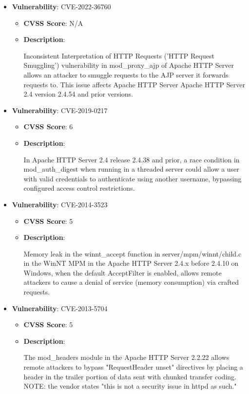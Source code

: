\documentclass{article}
\begin{document}
\begin{itemize}
        \item \textbf{Vulnerability}: CVE-2022-36760
        \begin{itemize}
            \item \textbf{CVSS Score}:  N/A 
            \item \textbf{Description}:
            \parbox[t]{0.9\linewidth}{
                \ttfamily Inconsistent Interpretation of HTTP Requests ('HTTP Request Smuggling') vulnerability in mod\_proxy\_ajp of Apache HTTP Server allows an attacker to smuggle requests to the AJP server it forwards requests to.  This issue affects Apache HTTP Server Apache HTTP Server 2.4 version 2.4.54 and prior versions.
            }
        \end{itemize}
    
        \item \textbf{Vulnerability}: CVE-2019-0217
        \begin{itemize}
            \item \textbf{CVSS Score}:  6 
            \item \textbf{Description}:
            \parbox[t]{0.9\linewidth}{
                \ttfamily In Apache HTTP Server 2.4 release 2.4.38 and prior, a race condition in mod\_auth\_digest when running in a threaded server could allow a user with valid credentials to authenticate using another username, bypassing configured access control restrictions.
            }
        \end{itemize}
    
        \item \textbf{Vulnerability}: CVE-2014-3523
        \begin{itemize}
            \item \textbf{CVSS Score}:  5 
            \item \textbf{Description}:
            \parbox[t]{0.9\linewidth}{
                \ttfamily Memory leak in the winnt\_accept function in server/mpm/winnt/child.c in the WinNT MPM in the Apache HTTP Server 2.4.x before 2.4.10 on Windows, when the default AcceptFilter is enabled, allows remote attackers to cause a denial of service (memory consumption) via crafted requests.
            }
        \end{itemize}
    
        \item \textbf{Vulnerability}: CVE-2013-5704
        \begin{itemize}
            \item \textbf{CVSS Score}:  5 
            \item \textbf{Description}:
            \parbox[t]{0.9\linewidth}{
                \ttfamily The mod\_headers module in the Apache HTTP Server 2.2.22 allows remote attackers to bypass "RequestHeader unset" directives by placing a header in the trailer portion of data sent with chunked transfer coding.  NOTE: the vendor states "this is not a security issue in httpd as such."
            }
        \end{itemize}
    

\end{itemize}
\end{document}
